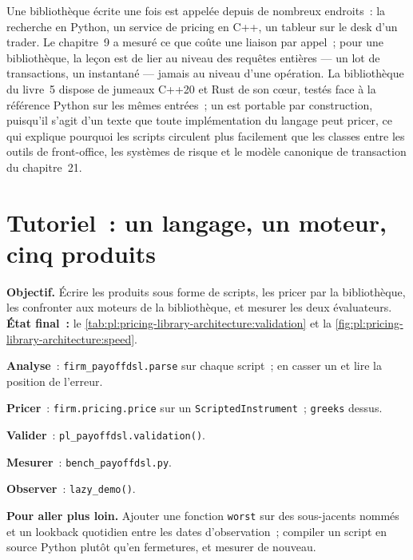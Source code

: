 Une bibliothèque écrite une fois est appelée depuis de nombreux endroits~: la recherche en Python, un service de pricing en C++, un tableur sur le desk d'un trader. Le chapitre~9
a mesuré ce que coûte une liaison par appel~; pour une bibliothèque, la leçon est de lier au niveau des requêtes entières --- un lot de transactions, un instantané
--- jamais au niveau d'une opération. La bibliothèque du livre~5 dispose de jumeaux C++20 et Rust de son cœur, testés face à la référence Python sur les
mêmes entrées~; un  est portable par construction, puisqu'il s'agit d'un texte que toute implémentation du langage peut pricer, ce qui explique pourquoi
les scripts circulent plus facilement que les classes entre les outils de front-office, les systèmes de risque et le modèle canonique de transaction du chapitre~21.

\section{Tutoriel~: un langage, un moteur, cinq produits}\label{tut:pl:pricing-library-architecture:tut}

\begin{tutorial}
\textbf{Objectif.} Écrire les produits sous forme de scripts, les pricer par la bibliothèque, les confronter aux moteurs de la bibliothèque, et mesurer les deux
évaluateurs. \textbf{État final~:} le \cref{tab:pl:pricing-library-architecture:validation} et la \cref{fig:pl:pricing-library-architecture:speed}.
\begin{tutsteps}
\item \textbf{Analyse}~: \texttt{firm\_payoffdsl.parse} sur chaque script~; en casser un et lire la position de l'erreur.
\item \textbf{Pricer}~: \texttt{firm.pricing.price} sur un \texttt{ScriptedInstrument}~; \texttt{greeks} dessus.
\item \textbf{Valider}~: \texttt{pl\_payoffdsl.validation()}.
\item \textbf{Mesurer}~: \texttt{bench\_payoffdsl.py}.
\item \textbf{Observer}~: \texttt{lazy\_demo()}.
\end{tutsteps}
\textbf{Pour aller plus loin.} Ajouter une fonction \texttt{worst} sur des sous-jacents nommés et un lookback quotidien entre les dates d'observation~; compiler un
script en source Python plutôt qu'en fermetures, et mesurer de nouveau.
\end{tutorial}

